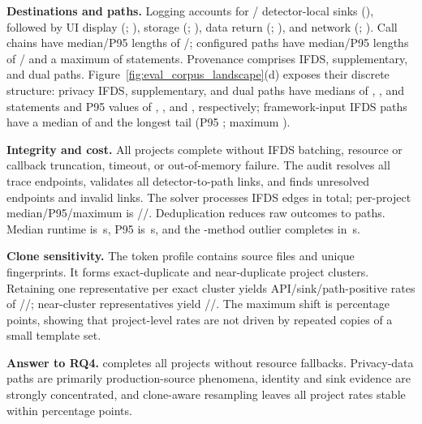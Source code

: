 \textbf{Destinations and paths.}
Logging accounts for \CorpusLogSinkCount/\CorpusSinkObservations{} detector-local sinks (\CorpusLogSinkShare), followed by UI display (\CorpusUiSinkCount; \CorpusUiSinkShare), storage (\CorpusStorageSinkCount; \CorpusStorageSinkShare), data return (\CorpusReturnSinkCount; \CorpusReturnSinkShare), and network (\CorpusNetworkSinkCount; \CorpusNetworkSinkShare). Call chains have median/P95 lengths of \CorpusChainMedian/\CorpusChainPNinetyFive; configured paths have median/P95 lengths of \CorpusPathMedian/\CorpusPathPNinetyFive{} and a maximum of \CorpusPathMaximum{} statements. Provenance comprises \CorpusIfdsPaths{} IFDS, \CorpusAsyncPaths{} supplementary, and \CorpusBothPaths{} dual paths. Figure~\ref{fig:eval_corpus_landscape}(d) exposes their discrete structure: privacy IFDS, supplementary, and dual paths have medians of \CorpusPrivacyIfdsPathMedian, \CorpusPrivacyAsyncPathMedian, and \CorpusPrivacyBothPathMedian{} statements and P95 values of \CorpusPrivacyIfdsPathPNinetyFive, \CorpusPrivacyAsyncPathPNinetyFive, and \CorpusPrivacyBothPathPNinetyFive, respectively; framework-input IFDS paths have a median of \CorpusFrameworkIfdsPathMedian{} and the longest tail (P95 \CorpusFrameworkIfdsPathPNinetyFive; maximum \CorpusFrameworkIfdsPathMaximum).

\textbf{Integrity and cost.}
All \CorpusProjects{} projects complete without IFDS batching, resource or callback truncation, timeout, or out-of-memory failure. The audit resolves all \CorpusTraceEndpoints{} trace endpoints, validates all \CorpusTaintFlowLinks{} detector-to-path links, and finds \CorpusUnresolvedTraceEndpoints{} unresolved endpoints and \CorpusInvalidTaintFlowLinks{} invalid links. The solver processes \CorpusIfdsEdges{} IFDS edges in total; per-project median/P95/maximum is \CorpusIfdsEdgesMedian/\CorpusIfdsEdgesPNinetyFive/\CorpusIfdsEdgesMaximum. Deduplication reduces \CorpusRawPaths{} raw outcomes to \CorpusPaths{} paths. Median runtime is \CorpusRuntimeMedian\,s, P95 is \CorpusRuntimePNinetyFive\,s, and the \CorpusMethodsMaximum{}-method outlier completes in \CorpusRuntimeMaximum\,s.

\textbf{Clone sensitivity.}
The token profile contains \CorpusSourceFiles{} source files and \CorpusUniqueFingerprints{} unique fingerprints. It forms \CorpusExactCloneClusters{} exact-duplicate and \CorpusNearCloneClusters{} near-duplicate project clusters. Retaining one representative per exact cluster yields API/sink/path-positive rates of \CorpusExactCloneApiRate/\CorpusExactCloneSinkRate/\CorpusExactClonePathRate; near-cluster representatives yield \CorpusNearCloneApiRate/\CorpusNearCloneSinkRate/\CorpusNearClonePathRate. The maximum shift is \CorpusCloneMaxShift{} percentage points, showing that project-level rates are not driven by repeated copies of a small template set.

\noindent\textbf{Answer to RQ4.}
\mytool completes all \CorpusProjects{} projects without resource fallbacks. Privacy-data paths are primarily production-source phenomena, identity and sink evidence are strongly concentrated, and clone-aware resampling leaves all project rates stable within \CorpusCloneMaxShift{} percentage points.
